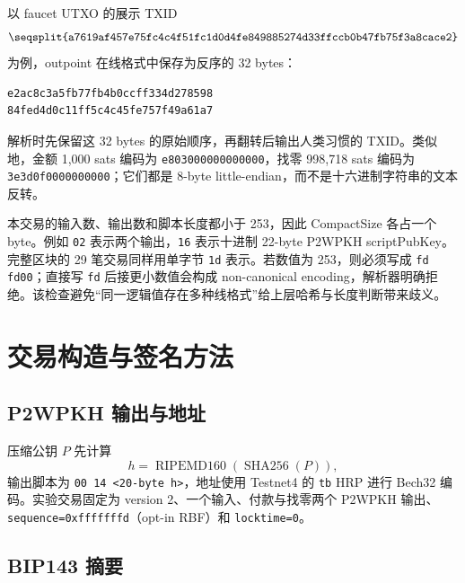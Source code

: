 \documentclass[11pt,a4paper,fontset=none]{ctexart}
\begin{document}
以 faucet UTXO 的展示 TXID
\[
\texttt{\seqsplit{a7619af457e75fc4c4f51fc1d0d4fe849885274d33ffccb0b47fb75f3a8cace2}}
\]
为例，outpoint 在线格式中保存为反序的 32 bytes：
\begin{lstlisting}[language={}]
e2ac8c3a5fb77fb4b0ccff334d278598
84fed4d0c11ff5c4c45fe757f49a61a7
\end{lstlisting}
解析时先保留这 32 bytes 的原始顺序，再翻转后输出人类习惯的 TXID。类似地，金额 1,000 sats 编码为 \texttt{e803000000000000}，找零 998,718 sats 编码为 \texttt{3e3d0f0000000000}；它们都是 8-byte little-endian，而不是十六进制字符串的文本反转。

本交易的输入数、输出数和脚本长度都小于 253，因此 CompactSize 各占一个 byte。例如 \texttt{02} 表示两个输出，\texttt{16} 表示十进制 22-byte P2WPKH scriptPubKey。完整区块的 29 笔交易同样用单字节 \texttt{1d} 表示。若数值为 253，则必须写成 \texttt{fd fd00}；直接写 \texttt{fd} 后接更小数值会构成 non-canonical encoding，解析器明确拒绝。该检查避免“同一逻辑值存在多种线格式”给上层哈希与长度判断带来歧义。

\section{交易构造与签名方法}

\subsection{P2WPKH 输出与地址}

压缩公钥 $P$ 先计算
\[
 h=\operatorname{RIPEMD160}(\operatorname{SHA256}(P)),
\]
输出脚本为 \texttt{00 14 <20-byte h>}，地址使用 Testnet4 的 \texttt{tb} HRP 进行 Bech32 编码。实验交易固定为 version 2、一个输入、付款与找零两个 P2WPKH 输出、\texttt{sequence=0xfffffffd}（opt-in RBF）和 \texttt{locktime=0}。

\subsection{BIP143 摘要}
\end{document}
